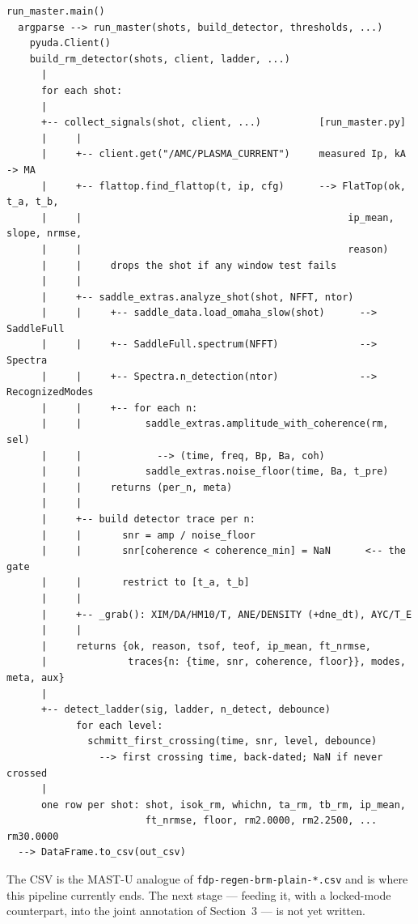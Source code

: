\documentclass[11pt,a4paper]{article}
\newcommand{\code}[1]{\texttt{\small #1}}
\newcommand{\bk}{\discretionary{}{}{}}   %
\begin{document}
\begin{small}
\begin{verbatim}
run_master.main()
  argparse --> run_master(shots, build_detector, thresholds, ...)
    pyuda.Client()
    build_rm_detector(shots, client, ladder, ...)
      |
      for each shot:
      |
      +-- collect_signals(shot, client, ...)          [run_master.py]
      |     |
      |     +-- client.get("/AMC/PLASMA_CURRENT")     measured Ip, kA -> MA
      |     +-- flattop.find_flattop(t, ip, cfg)      --> FlatTop(ok, t_a, t_b,
      |     |                                              ip_mean, slope, nrmse,
      |     |                                              reason)
      |     |     drops the shot if any window test fails
      |     |
      |     +-- saddle_extras.analyze_shot(shot, NFFT, ntor)
      |     |     +-- saddle_data.load_omaha_slow(shot)      --> SaddleFull
      |     |     +-- SaddleFull.spectrum(NFFT)              --> Spectra
      |     |     +-- Spectra.n_detection(ntor)              --> RecognizedModes
      |     |     +-- for each n:
      |     |           saddle_extras.amplitude_with_coherence(rm, sel)
      |     |             --> (time, freq, Bp, Ba, coh)
      |     |           saddle_extras.noise_floor(time, Ba, t_pre)
      |     |     returns (per_n, meta)
      |     |
      |     +-- build detector trace per n:
      |     |       snr = amp / noise_floor
      |     |       snr[coherence < coherence_min] = NaN      <-- the gate
      |     |       restrict to [t_a, t_b]
      |     |
      |     +-- _grab(): XIM/DA/HM10/T, ANE/DENSITY (+dne_dt), AYC/T_E
      |     |
      |     returns {ok, reason, tsof, teof, ip_mean, ft_nrmse,
      |              traces{n: {time, snr, coherence, floor}}, modes, meta, aux}
      |
      +-- detect_ladder(sig, ladder, n_detect, debounce)
            for each level:
              schmitt_first_crossing(time, snr, level, debounce)
                --> first crossing time, back-dated; NaN if never crossed
      |
      one row per shot: shot, isok_rm, whichn, ta_rm, tb_rm, ip_mean,
                        ft_nrmse, floor, rm2.0000, rm2.2500, ... rm30.0000
  --> DataFrame.to_csv(out_csv)
\end{verbatim}
\end{small}

\noindent
The CSV is the MAST-U analogue of \code{fdp-\bk regen-\bk brm-\bk plain-\bk *.csv} and is
where this pipeline currently ends. The next stage --- feeding it, with a locked-mode
counterpart, into the joint annotation of Section~3 --- is not yet written.
\end{document}
